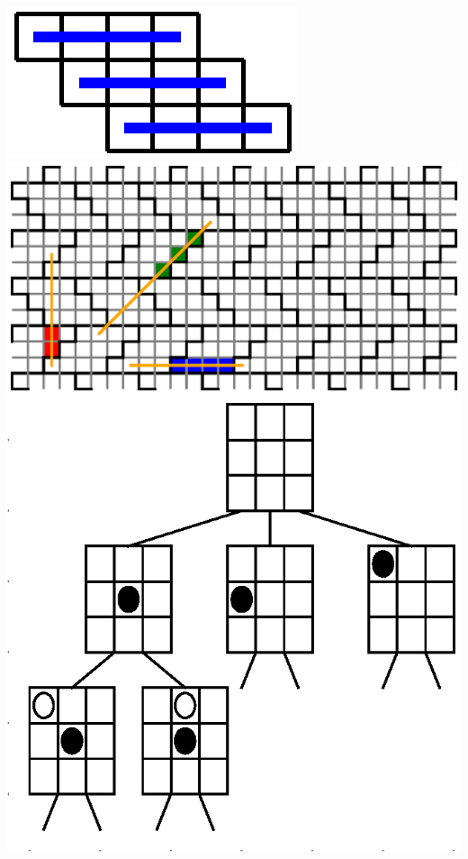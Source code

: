 \documentclass{article}
\begin{document}
\includegraphics{8-rules3.eps}
\\
\includegraphics{8-sol.eps}
\\
\includegraphics{arbre.eps}
\end{document}
